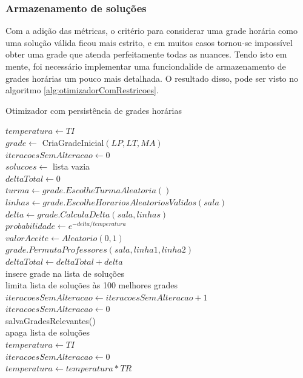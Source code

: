 \subsubsection{Armazenamento de soluções}
\label{subsec:salvamento}

Com a adição das métricas, o critério para considerar uma grade horária como uma solução válida ficou mais estrito, e em muitos casos tornou-se impossível obter uma grade que atenda perfeitamente todas as nuances. Tendo isto em mente, foi necessário implementar uma funciondalide de armazenamento de grades horárias um pouco mais detalhada. O resultado disso, pode ser visto no algoritmo \ref{alg:otimizadorComRestricoes}.

\begin{algorithm}
	\caption{Otimizador com persistência de grades horárias}
	\label{alg:otimizadorComRestricoes}
	$temperatura \leftarrow TI$\\
	$grade \leftarrow$ CriaGradeInicial$(LP, LT, MA)$\\
	$iteracoesSemAlteracao \leftarrow 0$\\
	$solucoes \leftarrow$ lista vazia\\
	 {
		$deltaTotal \leftarrow 0$\\
		 {
			$turma \leftarrow grade.EscolheTurmaAleatoria()$\\
			$linhas \leftarrow grade.EscolheHorariosAleatoriosValidos(sala)$\\
			$delta \leftarrow grade.CalculaDelta(sala, linhas)$\\
			$probabilidade \leftarrow e^{-delta/temperatura}$\\
			$valorAceite \leftarrow Aleatorio(0, 1)$\\
			 {
				$grade.PermutaProfessores(sala, linha1, linha2)$\\
				$deltaTotal \leftarrow deltaTotal + delta$\\
				 {
					insere grade na lista de soluções\\
					limita lista de soluções às 100 melhores grades\\
				}
			}
		}
		 {
			$iteracoesSemAlteracao \leftarrow iteracoesSemAlteracao + 1$\\
		}{
			$iteracoesSemAlteracao \leftarrow 0$\\
		}
		 {
			salvaGradesRelevantes()\\
			apaga lista de soluções\\
			$temperatura \leftarrow TI$\\
			$iteracoesSemAlteracao \leftarrow 0$\\
		}
		$temperatura \leftarrow temperatura * TR$
	}
\end{algorithm}
\pagebreak

